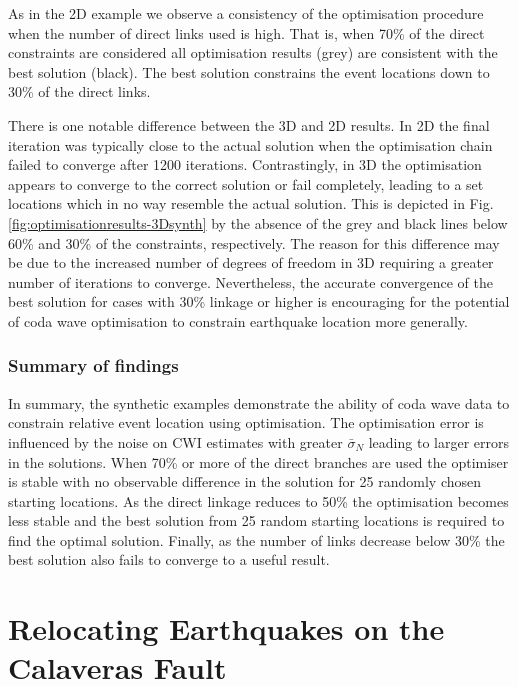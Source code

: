 \documentclass[extra]{gji}
\begin{document}
As in the 2D example we observe a consistency of the optimisation
procedure when the number of direct links used is high. That is,
when 70\% of the direct constraints are considered all optimisation
results (grey) are consistent with the best solution (black). The
best solution constrains the event locations down to 30\% of the
direct links.

There is one notable difference between the 3D and 2D results. In 2D
the final iteration was typically close to the actual solution when
the optimisation chain failed to converge after 1200 iterations.
Contrastingly, in 3D the optimisation appears to converge to the
correct solution or fail completely, leading to a set locations
which in no way resemble the actual solution. This is depicted in
Fig. \ref{fig:optimisationresults-3Dsynth} by the absence of the
grey and black lines below 60\% and 30\% of the constraints,
respectively. The reason for this difference may be due to the
increased number of degrees of freedom in 3D requiring a greater
number of iterations to converge. Nevertheless, the accurate
convergence of the best solution for cases with 30\% linkage or
higher is encouraging for the potential of coda wave optimisation to
constrain earthquake location more generally.

\subsubsection{Summary of findings}

In summary, the synthetic examples demonstrate the ability of coda
wave data to constrain relative event location using optimisation.
The optimisation error is influenced by the noise on CWI estimates
with greater $\bar{\sigma}_N$ leading to larger errors in the
solutions. When 70\% or more of the direct branches are used the
optimiser is stable with no observable difference in the solution
for 25 randomly chosen starting locations. As the direct linkage
reduces to 50\% the optimisation becomes less stable and the best
solution from 25 random starting locations is required to find the
optimal solution. Finally, as the number of links decrease below
30\% the best solution also fails to converge to a useful result.


\section{Relocating Earthquakes on the Calaveras Fault}
\label{sec:CalaverasLoc-CWIonly}
\end{document}
